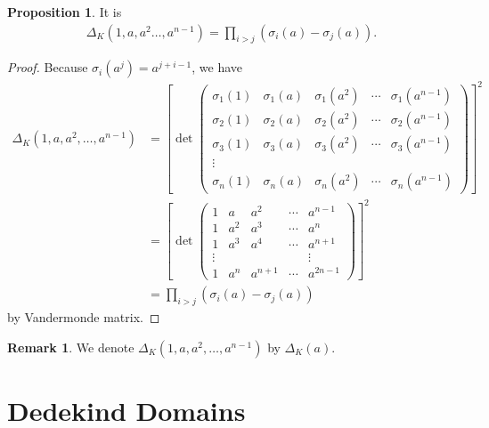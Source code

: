 \documentclass[a4paper]{book}
\theoremstyle{definition}
\newtheorem{proposition}[definition]{Proposition}
\newtheorem*{remark}{Remark}
\begin{document}
\begin{thmbox}
    \begin{proposition}
        It is
        \begin{align*}
            \Delta_K(1, a, a^2 \ldots, a^{n-1}) = \prod_{i > j} (\sigma_i(a) - \sigma_j(a)) \text{.}
        \end{align*}
    \end{proposition}
\end{thmbox}
\begin{proof}
    Because \(\sigma_i(a^j) = a^{j + i - 1}\), we have
    \begin{align*}
        \Delta_K(1, a, a^2, \ldots, a^{n-1}) &= \left[\det \begin{pmatrix}
            \sigma_1(1) & \sigma_1(a) & \sigma_1(a^2) & \cdots & \sigma_1(a^{n-1}) \\
            \sigma_2(1) & \sigma_2(a) & \sigma_2(a^2) & \cdots & \sigma_2(a^{n-1}) \\
            \sigma_3(1) & \sigma_3(a) & \sigma_3(a^2) & \cdots & \sigma_3(a^{n-1}) \\
            \vdots & & & & \\
            \sigma_n(1) & \sigma_n(a) & \sigma_n(a^2) & \cdots & \sigma_n(a^{n-1})
        \end{pmatrix}\right]^2 \\
        &= \left[\det \begin{pmatrix}
            1 & a & a^2 & \cdots & a^{n-1} \\
            1 & a^2 & a^3 & \cdots & a^n \\
            1 & a^3 & a^4 & \cdots & a^{n+1} \\
            \vdots & & & & \vdots \\
            1 & a^n & a^{n+1} & \cdots & a^{2n - 1}
        \end{pmatrix}\right]^2 \\
        &= \prod_{i>j} (\sigma_i(a) - \sigma_j(a))
    \end{align*}
    by Vandermonde matrix.
\end{proof}
\begin{rembox}
    \begin{remark}
        We denote \(\Delta_K(1, a, a^2, \ldots, a^{n-1})\) by \(\Delta_K(a)\).
    \end{remark}
\end{rembox}

\chapter{Dedekind Domains}
\end{document}
